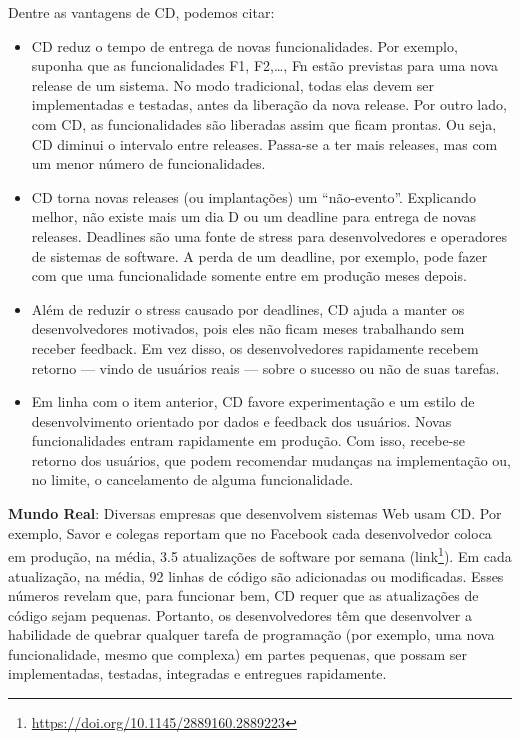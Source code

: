 \documentclass[
  11pt,
  twoside]{book}
\DeclareRobustCommand{\href}[2]{#2\footnote{\url{#1}}}
\newenvironment{esmbox}{\centering \vspace{1.5ex} \begin{tcolorbox}[breakable, colback=backcolor, width=4.9in]}{\end{tcolorbox} \vspace{1.5ex}}
\begin{document}
Dentre as vantagens de CD, podemos citar:

\begin{itemize}
\item
  CD reduz o tempo de entrega de novas funcionalidades. Por exemplo,
  suponha que as funcionalidades F1, F2,\ldots, Fn estão previstas para
  uma nova release de um sistema. No modo tradicional, todas elas devem
  ser implementadas e testadas, antes da liberação da nova release. Por
  outro lado, com CD, as funcionalidades são liberadas assim que ficam
  prontas. Ou seja, CD diminui o intervalo entre releases. Passa-se a
  ter mais releases, mas com um menor número de funcionalidades.
\item
  CD torna novas releases (ou implantações) um ``não-evento''.
  Explicando melhor, não existe mais um dia D ou um deadline para
  entrega de novas releases. Deadlines são uma fonte de stress para
  desenvolvedores e operadores de sistemas de software. A perda de um
  deadline, por exemplo, pode fazer com que uma funcionalidade somente
  entre em produção meses depois.
\item
  Além de reduzir o stress causado por deadlines, CD ajuda a manter os
  desenvolvedores motivados, pois eles não ficam meses trabalhando sem
  receber feedback. Em vez disso, os desenvolvedores rapidamente recebem
  retorno --- vindo de usuários reais --- sobre o sucesso ou não de suas
  tarefas.
\item
  Em linha com o item anterior, CD favore experimentação e um estilo de
  desenvolvimento orientado por dados e feedback dos usuários. Novas
  funcionalidades entram rapidamente em produção. Com isso, recebe-se
  retorno dos usuários, que podem recomendar mudanças na implementação
  ou, no limite, o cancelamento de alguma funcionalidade.
\end{itemize}


\begin{esmbox}

\textbf{Mundo Real}: Diversas empresas que desenvolvem sistemas Web usam
CD. Por exemplo, Savor e colegas reportam que no Facebook cada
desenvolvedor coloca em produção, na média, 3.5 atualizações de software
por semana (\href{https://doi.org/10.1145/2889160.2889223}{link}). Em
cada atualização, na média, 92 linhas de código são adicionadas ou
modificadas. Esses números revelam que, para funcionar bem, CD requer
que as atualizações de código sejam pequenas. Portanto, os
desenvolvedores têm que desenvolver a habilidade de quebrar qualquer
tarefa de programação (por exemplo, uma nova funcionalidade, mesmo que
complexa) em partes pequenas, que possam ser implementadas, testadas,
integradas e entregues rapidamente.

\end{esmbox}
\end{document}
